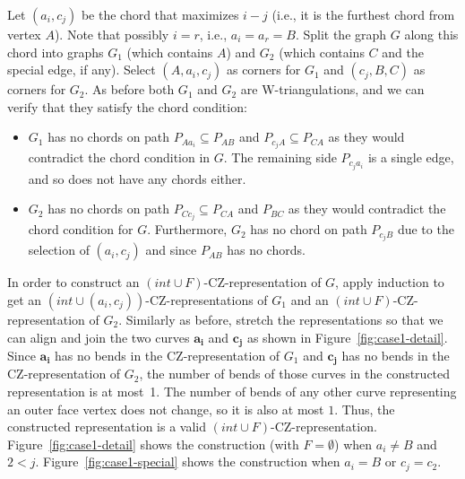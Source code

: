 \documentclass{article}
\renewcommand{\int}[1]{$(\mathit{int}\cup{#1})$}
\begin{document}
Let $(a_i,c_j)$ be the chord that maximizes $i-j$ (i.e., it is the furthest chord from vertex $A$). 
Note that possibly $i = r$, i.e., $a_i = a_r = B$. 
Split the graph $G$ along this chord into graphs  $G_1$ (which contains $A$)
and $G_2$ (which contains $C$ and the special edge, if any).
Select $(A,a_i,c_j)$ as corners for $G_1$ and $(c_j,B,C)$ as corners for $G_2$.
As before both $G_1$ and $G_2$ are W-triangulations, and we can verify
that they satisfy the chord condition:
\begin{itemize}
\item $G_1$ has no chords on path $P_{Aa_i} \subseteq P_{AB}$ and $P_{c_jA} \subseteq P_{CA}$ as they would contradict the chord condition
in $G$. The remaining side $P_{c_ja_i}$ is a single edge, and so does not have any chords either.
\item $G_2$ has no chords on path $P_{Cc_j} \subseteq P_{CA}$ and $P_{BC}$ as they would contradict
the chord condition for $G$. Furthermore, $G_2$ has no chord on path $P_{c_jB}$ due to the selection
of $(a_i,c_j)$ and since $P_{AB}$ has no chords.
\end{itemize}

In order to construct an \int{F}-CZ-representation of $G$,
apply induction to get an \int{(a_i,c_j)}-CZ-representations of 
$G_1$ and an \int{F}-CZ-representation of 
$G_2$. Similarly as before, stretch the representations so that we can 
align and join the two 
curves $\mathbf{a_i}$ and $\mathbf{c_j}$ as shown in Figure~\ref{fig:case1-detail}. Since $\mathbf{a_i}$ 
has no bends in the CZ-representation of $G_1$ and $\mathbf{c_j}$ has no bends in the CZ-representation of $G_2$, the number of bends of those curves in the constructed representation is at most~1. The
number of bends of any other curve representing an outer face vertex does not change, so it is also at most $1$. Thus, the constructed representation is a valid
\int{F}-CZ-representation.
Figure~\ref{fig:case1-detail} shows the construction 
(with $F=\emptyset$) when $a_i \neq B$ and $2 < j $. 
Figure~\ref{fig:case1-special} shows the construction 
when $a_i = B$ or $c_j = c_2$.
\end{document}
